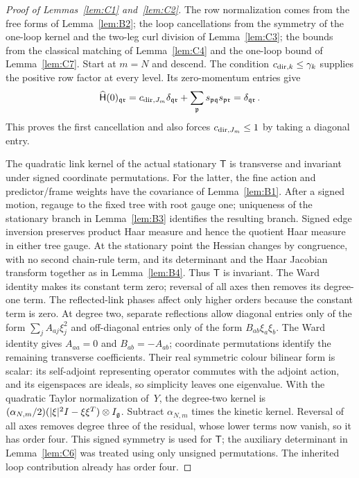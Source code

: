 \begin{proof}[Proof of Lemmas~\ref{lem:C1} and~\ref{lem:C2}]
The row normalization comes from the free forms of Lemma~\ref{lem:B2}; the loop cancellations from the symmetry of the one-loop kernel and the two-leg curl division of Lemma~\ref{lem:C3}; the bounds from the classical matching of Lemma~\ref{lem:C4} and the one-loop bound of Lemma~\ref{lem:C7}. Start at $m=N$ and descend. The condition $c_{{\rm dir},k}\le\gamma_k$ supplies the positive row factor at every level. Its zero-momentum entries give
\begin{equation*}
\widehat{\mathsf H}(0)_{\mathfrak q\mathfrak r}
=c_{{\rm dir},J_m}\delta_{\mathfrak q\mathfrak r}
+\sum_{\mathfrak p}s_{\mathfrak p\mathfrak q}s_{\mathfrak p\mathfrak r}
=\delta_{\mathfrak q\mathfrak r}\,.
\end{equation*}
This proves the first cancellation and also forces $c_{{\rm dir},J_m}\le1$ by taking a diagonal entry.

The quadratic link kernel of the actual stationary $\mathsf T$ is transverse and invariant under signed coordinate permutations. For the latter, the fine action and predictor/frame weights have the covariance of Lemma~\ref{lem:B1}. After a signed motion, regauge to the fixed tree with root gauge one; uniqueness of the stationary branch in Lemma~\ref{lem:B3} identifies the resulting branch. Signed edge inversion preserves product Haar measure and hence the quotient Haar measure in either tree gauge. At the stationary point the Hessian changes by congruence, with no second chain-rule term, and its determinant and the Haar Jacobian transform together as in Lemma~\ref{lem:B4}. Thus $\mathsf T$ is invariant. The Ward identity makes its constant term zero; reversal of all axes then removes its degree-one term. The reflected-link phases affect only higher orders because the constant term is zero. At degree two, separate reflections allow diagonal entries only of the form $\sum_j A_{aj}\xi_j^2$ and off-diagonal entries only of the form $B_{ab}\xi_a\xi_b$. The Ward identity gives $A_{aa}=0$ and $B_{ab}=-A_{ab}$; coordinate permutations identify the remaining transverse coefficients. Their real symmetric colour bilinear form is scalar: its self-adjoint representing operator commutes with the adjoint action, and its eigenspaces are ideals, so simplicity leaves one eigenvalue. With the quadratic Taylor normalization of~$Y$, the degree-two kernel is $(\alpha_{N,m}/2)(|\xi|^2I-\xi\xi^T)\otimes I_{\mathfrak{g}}$. Subtract $\alpha_{N,m}$ times the kinetic kernel. Reversal of all axes removes degree three of the residual, whose lower terms now vanish, so it has order four. This signed symmetry is used for $\mathsf T$; the auxiliary determinant in Lemma~\ref{lem:C6} was treated using only unsigned permutations. The inherited loop contribution already has order four.


\end{proof}
